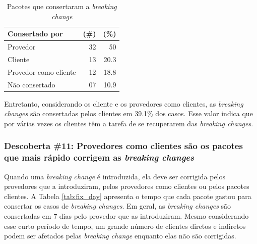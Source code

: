 \begin{table}
	\centering
	\caption{Pacotes que consertaram a \textit{breaking change}}
	\begin{tabular}{lrr}
		\toprule
		\textbf{Consertado por} & \textbf{(\#)} & \textbf{(\%)} \\ \hline
		Provedor                & 32            & 50            \\
		Cliente                 & 13            & 20.3          \\
		Provedor como cliente   & 12            & 18.8          \\
		Não consertado          & 07            & 10.9          \\ \bottomrule
	\end{tabular}
	\label{tab:package_fix}
\end{table}

Entretanto, considerando os cliente e os provedores como clientes, as \textit{breaking changes} são consertadas pelos clientes em 39.1\% dos casos. Esse valor indica que por várias vezes os clientes têm a tarefa de se recuperarem das \textit{breaking changes}.

\subsubsection{Descoberta \#11: Provedores como clientes são os pacotes que mais rápido corrigem as \textit{breaking changes}}

Quando uma \textit{breaking change} é introduzida, ela deve ser corrigida pelos provedores que a introduziram, pelos provedores como clientes ou pelos pacotes clientes. A Tabela \ref{tab:fix_day} apresenta o tempo que cada pacote gastou para consertar os casos de \textit{breaking changes}. Em geral, as \textit{breaking changes} são consertadas em 7 dias pelo provedor que as introduziram. Mesmo considerando esse curto período de tempo, um grande número de clientes diretos e indiretos podem ser afetados pelas \textit{breaking change} enquanto elas não são corrigidas.

